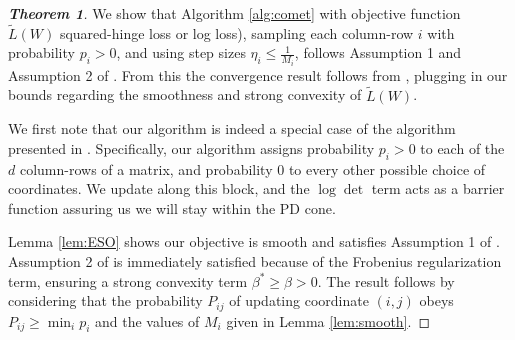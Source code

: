 \documentclass[twoside,11pt]{article}
\newcommand\mat[1]{{#1}}
\newcommand{\W}{\mat{W}}
\newcommand{\Pp}{\mat{P}}
\newcommand{\tL}{\tilde{L}(\W)}
\begin{document}

\begin{proof}[{\bf{Theorem 1}}]
We show that Algorithm \ref{alg:comet} with objective function $\tL$ squared-hinge loss or log loss), sampling each column-row $i$ with probability $p_i >0$, and using step sizes $\eta_i \leq \frac{1}{M_i}$, follows Assumption 1 and Assumption 2 of \citet{richtarik2013optimal}. From this the convergence result follows from \citeauthor[Theorem 3]{richtarik2013optimal}, plugging in our bounds regarding the smoothness and strong convexity of $\tL$.

We first note that our algorithm is indeed a special case of the algorithm presented in \citet{richtarik2013optimal}. Specifically, our algorithm assigns probability $p_i > 0 $ to each of the $d$ column-rows of a matrix, and probability $0$ to every other possible choice of coordinates. We update along this block, and the $\log \det$ term acts as a barrier function
assuring us we will stay within the PD cone.

Lemma \ref{lem:ESO} shows our objective is smooth and satisfies Assumption 1 of \citeauthor{richtarik2013optimal}. Assumption 2 of \citeauthor{richtarik2013optimal} is immediately satisfied because of the Frobenius regularization term, ensuring a strong convexity term $\beta^* \geq \beta > 0$. The result follows by considering that the probability $\Pp_{ij}$ of updating coordinate $(i,j)$ obeys $\Pp_{ij} \geq \min_i p_i $ and the values of $M_i$ given in Lemma \ref{lem:smooth}.
\end{proof}

\vspace{-20pt}
\end{document}
